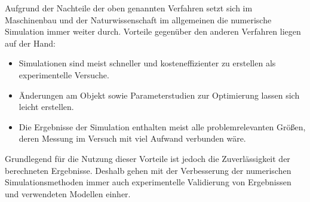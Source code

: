 Aufgrund der Nachteile der oben genannten Verfahren setzt sich im Maschinenbau und der
Naturwissenschaft im allgemeinen die numerische Simulation immer weiter durch. Vorteile
gegenüber den anderen Verfahren liegen auf der Hand:

\begin{itemize}
  \item Simulationen sind meist schneller und kosteneffizienter zu erstellen als experimentelle
    Versuche.
  \item Änderungen am Objekt sowie Parameterstudien zur Optimierung lassen sich leicht
    erstellen.
  \item Die Ergebnisse der Simulation enthalten meist alle problemrelevanten Größen,
    deren Messung im Versuch mit viel Aufwand verbunden wäre.
\end{itemize}

Grundlegend für die Nutzung dieser Vorteile ist jedoch die Zuverlässigkeit der
berechneten Ergebnisse. Deshalb gehen mit der Verbesserung der numerischen Simulationsmethoden
immer auch experimentelle Validierung von Ergebnissen und verwendeten Modellen einher.
